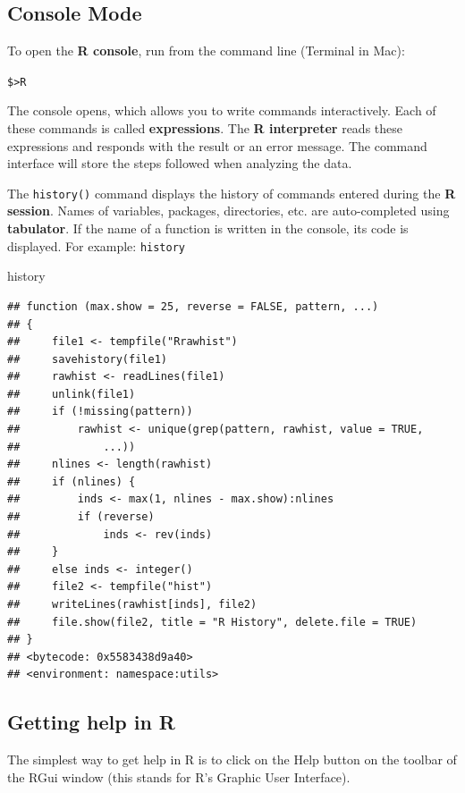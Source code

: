 \documentclass[
]{book}
\newenvironment{Shaded}{\begin{snugshade}}{\end{snugshade}}
\newcommand{\NormalTok}[1]{#1}
\theoremstyle{definition}
\theoremstyle{definition}
\theoremstyle{definition}
\theoremstyle{definition}
\theoremstyle{remark}
\begin{document}
\hypertarget{console-mode}{%
\subsection{Console Mode}\label{console-mode}}

To open the \textbf{R console}, run from the command line (Terminal in Mac):

\texttt{\$\textgreater{}R}

The console opens, which allows you to write commands interactively. Each of these commands is called \textbf{expressions}. The \textbf{R interpreter} reads these expressions and responds with the result or an error message. The command interface will store the steps followed when analyzing the data.

The \texttt{history()} command displays the history of commands entered during the \textbf{R session}. Names of variables, packages, directories, etc. are auto-completed using \textbf{tabulator}. If the name of a function is written in the console, its code is displayed. For example: \texttt{history}

\begin{Shaded}
\begin{Highlighting}[]
\NormalTok{history}
\end{Highlighting}
\end{Shaded}

\begin{verbatim}
## function (max.show = 25, reverse = FALSE, pattern, ...) 
## {
##     file1 <- tempfile("Rrawhist")
##     savehistory(file1)
##     rawhist <- readLines(file1)
##     unlink(file1)
##     if (!missing(pattern)) 
##         rawhist <- unique(grep(pattern, rawhist, value = TRUE, 
##             ...))
##     nlines <- length(rawhist)
##     if (nlines) {
##         inds <- max(1, nlines - max.show):nlines
##         if (reverse) 
##             inds <- rev(inds)
##     }
##     else inds <- integer()
##     file2 <- tempfile("hist")
##     writeLines(rawhist[inds], file2)
##     file.show(file2, title = "R History", delete.file = TRUE)
## }
## <bytecode: 0x5583438d9a40>
## <environment: namespace:utils>
\end{verbatim}

\hypertarget{getting-help-in-r}{%
\subsection{Getting help in R}\label{getting-help-in-r}}

The simplest way to get help in R is to click on the Help button on the toolbar of the RGui window (this stands for R's Graphic User Interface).
\end{document}
